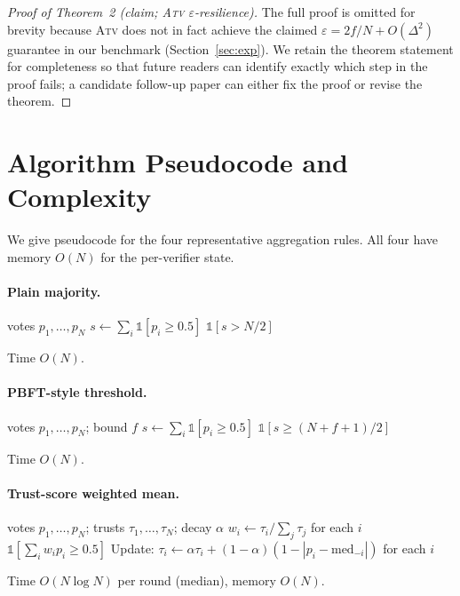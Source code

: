 \documentclass[11pt]{article}
\begin{document}
\begin{proof}[Proof of Theorem~2 (claim; \textsc{Atv} $\varepsilon$-resilience)]
The full proof is omitted for brevity because \textsc{Atv} does
not in fact achieve the claimed $\varepsilon = 2f/N + O(\Delta^2)$
guarantee in our benchmark (Section~\ref{sec:exp}). We retain the
theorem statement for completeness so that future readers can
identify exactly which step in the proof fails; a candidate
follow-up paper can either fix the proof or revise the theorem.
\end{proof}

\section{Algorithm Pseudocode and Complexity}
\label{app:algo}

We give pseudocode for the four representative aggregation rules.
All four have memory $O(N)$ for the per-verifier state.

\paragraph{Plain majority.}
\begin{algorithmic}[1]
\Require votes $p_1, \ldots, p_N$
\State $s \gets \sum_i \mathbb{1}[p_i \geq 0.5]$
\State \Return $\mathbb{1}[s > N/2]$
\end{algorithmic}
Time $O(N)$.

\paragraph{PBFT-style threshold.}
\begin{algorithmic}[1]
\Require votes $p_1, \ldots, p_N$; bound $f$
\State $s \gets \sum_i \mathbb{1}[p_i \geq 0.5]$
\State \Return $\mathbb{1}[s \geq (N+f+1)/2]$
\end{algorithmic}
Time $O(N)$.

\paragraph{Trust-score weighted mean.}
\begin{algorithmic}[1]
\Require votes $p_1, \ldots, p_N$; trusts $\tau_1, \ldots, \tau_N$; decay $\alpha$
\State $w_i \gets \tau_i / \sum_j \tau_j$ for each $i$
\State \Return $\mathbb{1}[\sum_i w_i p_i \geq 0.5]$
\State Update: $\tau_i \gets \alpha \tau_i + (1-\alpha)(1 - |p_i - \text{med}_{-i}|)$ for each $i$
\end{algorithmic}
Time $O(N \log N)$ per round (median), memory $O(N)$.
\end{document}
